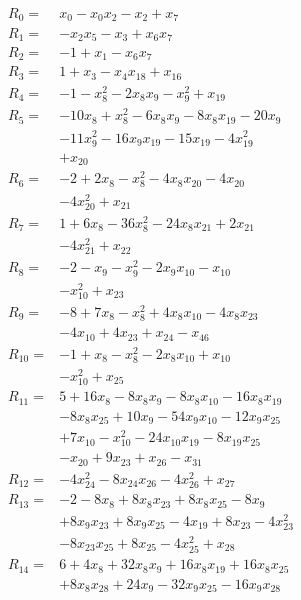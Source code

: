 \allowdisplaybreaks[4]
\begin{align*}
R_{0}={}&x_{0} -x_{0}x_{2} -x_{2} +x_{7}\\[3pt]
R_{1}={}&-x_{2}x_{5} -x_{3} +x_{6}x_{7}\\[3pt]
R_{2}={}&-1 +x_{1} -x_{6}x_{7}\\[3pt]
R_{3}={}&1 +x_{3} -x_{4}x_{18} +x_{16}\\[3pt]
R_{4}={}&-1 -x_{8}^{2} -2x_{8}x_{9} -x_{9}^{2} +x_{19}\\[3pt]
R_{5}={}&-10x_{8} +x_{8}^{2} -6x_{8}x_{9} -8x_{8}x_{19} -20x_{9}\\
&-11x_{9}^{2} -16x_{9}x_{19} -15x_{19} -4x_{19}^{2}\\
&+x_{20}\\[3pt]
R_{6}={}&-2 +2x_{8} -x_{8}^{2} -4x_{8}x_{20} -4x_{20}\\
&-4x_{20}^{2} +x_{21}\\[3pt]
R_{7}={}&1 +6x_{8} -36x_{8}^{2} -24x_{8}x_{21} +2x_{21}\\
&-4x_{21}^{2} +x_{22}\\[3pt]
R_{8}={}&-2 -x_{9} -x_{9}^{2} -2x_{9}x_{10} -x_{10}\\
&-x_{10}^{2} +x_{23}\\[3pt]
R_{9}={}&-8 +7x_{8} -x_{8}^{2} +4x_{8}x_{10} -4x_{8}x_{23}\\
&-4x_{10} +4x_{23} +x_{24} -x_{46}\\[3pt]
R_{10}={}&-1 +x_{8} -x_{8}^{2} -2x_{8}x_{10} +x_{10}\\
&-x_{10}^{2} +x_{25}\\[3pt]
R_{11}={}&5 +16x_{8} -8x_{8}x_{9} -8x_{8}x_{10} -16x_{8}x_{19}\\
&-8x_{8}x_{25} +10x_{9} -54x_{9}x_{10} -12x_{9}x_{25}\\
&+7x_{10} -x_{10}^{2} -24x_{10}x_{19} -8x_{19}x_{25}\\
&-x_{20} +9x_{23} +x_{26} -x_{31}\\[3pt]
R_{12}={}&-4x_{24}^{2} -8x_{24}x_{26} -4x_{26}^{2} +x_{27}\\[3pt]
R_{13}={}&-2 -8x_{8} +8x_{8}x_{23} +8x_{8}x_{25} -8x_{9}\\
&+8x_{9}x_{23} +8x_{9}x_{25} -4x_{19} +8x_{23} -4x_{23}^{2}\\
&-8x_{23}x_{25} +8x_{25} -4x_{25}^{2} +x_{28}\\[3pt]
R_{14}={}&6 +4x_{8} +32x_{8}x_{9} +16x_{8}x_{19} +16x_{8}x_{25}\\
&+8x_{8}x_{28} +24x_{9} -32x_{9}x_{25} -16x_{9}x_{28}\\

\end{align*}
